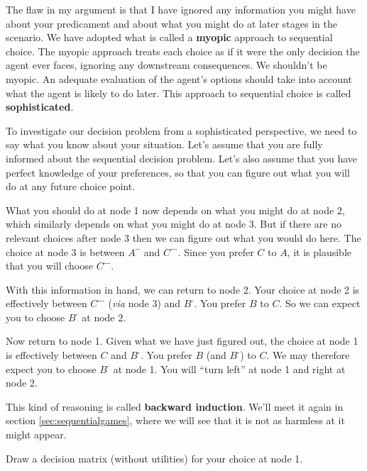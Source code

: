 The flaw in my argument is that I have ignored any information you might have
about your predicament and about what you might do at later stages in the
scenario. We have adopted what is called a \textbf{myopic} approach to
sequential choice. The myopic approach treats each choice as if it were the only
decision the agent ever faces, ignoring any downstream consequences. We
shouldn't be myopic. An adequate evaluation of the agent's options should take
into account what the agent is likely to do later. This approach to sequential
choice is called \textbf{sophisticated}.

To investigate our decision problem from a sophisticated perspective, we need to
say what you know about your situation. Let's assume that you are fully
informed about the sequential decision problem. Let's also assume that you have
perfect knowledge of your preferences, so that you can figure out what you will
do at any future choice point.

What you should do at node 1 now depends on what you might do at node 2, which
similarly depends on what you might do at node 3. But if there are no relevant
choices after node 3 then we can figure out what you would do here. The choice
at node 3 is between $A^{\text{-}\text{-}}$ and $C^{\text{-}\text{-}\text{-}}$.
Since you prefer $C$ to $A$, it is plausible that you will choose
$C^{\text{-}\text{-}\text{-}}$.


With this information in hand, we can return to node 2. Your choice at node 2 is
effectively between $C^{\text{-}\text{-}\text{-}}$ (\emph{via} node 3) and
$B^{\text{-}}$. You prefer $B$ to $C$. So we can expect you to choose
$B^{\text{-}}$ at node 2.

Now return to node 1. Given what we have just figured out, the choice at node 1
is effectively between $C$ and $B^{\text{-}}$. You prefer $B$ (and
$B^{\text{-}}$) to $C$. We may therefore expect you to choose $B^{\text{-}}$ at
node 1. You will ``turn left'' at node 1 and right at node 2.

This kind of reasoning is called \textbf{backward induction}. We'll meet it
again in section \ref{sec:sequentialgames}, where we will see that it is not as
harmless at it might appear.

\begin{exercise}{3}
  Draw a decision matrix (without utilities) for your choice at node 1.
\end{exercise}


